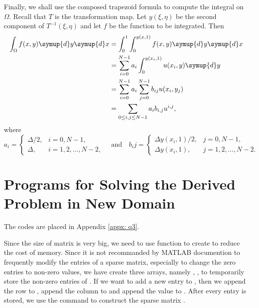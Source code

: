 \documentclass{assignment}[2019/10/15]
\begin{document}
    Finally, we shall use the composed trapezoid formula to compute the integral on $\Omega$. Recall that $T$ is the transformation map. Let $y(\xi, \eta)$ be the second component of $T^{-1}(\xi, \eta)$ and let $f$ be the function to be integrated. Then
    \begin{equation}
        \begin{aligned}
            \int_{\Omega}f(x, y)\symup{d}y\symup{d}x
            &= \int_0^1\int_0^{y(x, 1)}f(x, y)\symup{d}y\symup{d}x\\
            &= \sum_{i=0}^{N-1}a_i\int_0^{y(x_i, 1)}u(x_i, y)\symup{d}y\\
            &= \sum_{i=0}^{N-1}a_i\sum_{j=0}^{N-1}b_{ij}u(x_i, y_j)\\
            &= \sum_{0\leq i, j\leq N-1}a_ib_{i,j}u^{i,j},
        \end{aligned}
    \end{equation}
    where
    \begin{equation}
        a_i =
        \begin{cases}
            \Delta/2, &i = 0, N-1,\\
            \Delta, &i = 1, 2, \dotsc, N-2,
        \end{cases}
        \quad\text{and}\quad
        b_ij=
        \begin{cases}
            \Delta y(x_i, 1)/2, &j = 0, N-1,\\
            \Delta y(x_i, 1), &j = 1, 2, \dotsc, N-2.
        \end{cases}
    \end{equation}

    \section{Programs for Solving the Derived Problem in New Domain}

    The codes are placed in Appendix \ref{appx: q3}.

    Since the size of matrix  is very big, we need to use  function to create  to reduce the cost of memory. Since it is not recommanded by MATLAB documention to frequently modify the entries of a sparse matrix, especially to change the zero entries to non-zero values, we have create three arrays, namely , ,  to temporarily store the non-zero entries of . If we want to add a new entry to , then we append the row to , append the column to  and append the value to . After every entry is stored, we use the command  to construct the sparse matrix .
\end{document}

